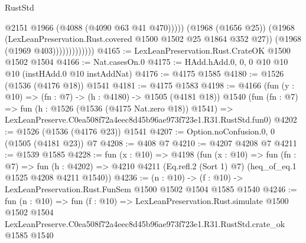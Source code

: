 \begin{lexlean}{RustStd}
\begin{coremodule}
                                @2151
                                @1966
                                (@4088 (@4090 @63 @41 @470)))))
                          (@1968 (@1656 @25))
                          (@1968 (LexLeanPreservation.Rust.covered @1500 @1502 @25 @1864 @352 @27))
                          (@1968 (@1969 @403)))))))))))))
@4165 := LexLeanPreservation.Rust.CrateOK @1500 @1502 @1504
@4166 := Nat.casesOn.{0}
@4175 := HAdd.hAdd.{0, 0, 0} @10 @10 @10 (instHAdd.{0} @10 instAddNat)
@4176 := @4175 @1585
@4180 := @1526 (@1536 (@4176 @18)) @1541
@4181 := @4175 @1583
@4198 := @4166
    (fun (y : @10) => (fn : @7) -> (h : @4180) -> @1505 (@4181 @18))
    @1540
    (fun (fn : @7) =>
    fun (h : @1526 (@1536 (@4175 Nat.zero @18)) @1541) =>
    LexLeanPreserve.C0ea508f72a4eec8d45b96ae973f723e1.R31.RustStd.fun0)
@4202 := @1526 (@1536 (@4176 @23)) @1541
@4207 := Option.noConfusion.{0, 0} (@1505 (@4181 @23)) @7
@4208 := @408 @7
@4210 := @4207 @4208 @7
@4211 := @1539 @1585
@4228 := fun (x : @10) =>
  @4198
    (fun (x : @10) =>
    fun (fn : @7) =>
    fun (h : @4202) =>
    @4210 @4211 (Eq.refl.{2} (Sort 1) @7) (heq_of_eq.{1} @1525 @4208 @4211 @1540))
@4236 := (n : @10) -> (f : @10) -> LexLeanPreservation.Rust.FunSem @1500 @1502 @1504 @1585 @1540
@4246 := fun (n : @10) =>
  fun (f : @10) =>
  LexLeanPreservation.Rust.simulate
    @1500
    @1502
    @1504
    LexLeanPreserve.C0ea508f72a4eec8d45b96ae973f723e1.R31.RustStd.crate_ok
    @1585
    @1540
\end{coremodule}
\end{lexlean}
